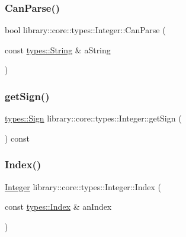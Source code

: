 \subsubsection{\texorpdfstring{CanParse()}{CanParse()}\hspace{0.1cm}{\footnotesize\ttfamily [2/2]}}
{\footnotesize\ttfamily bool library\+::core\+::types\+::\+Integer\+::\+Can\+Parse (\begin{DoxyParamCaption}\item[{const \mbox{\hyperlink{classlibrary_1_1core_1_1types_1_1_string}{types\+::\+String}} \&}]{a\+String }\end{DoxyParamCaption})\hspace{0.3cm}{\ttfamily [static]}}

\mbox{\label{classlibrary_1_1core_1_1types_1_1_integer_abe567cca5d1e448329195df5d16d48e6}} 
\subsubsection{\texorpdfstring{getSign()}{getSign()}}
{\footnotesize\ttfamily \mbox{\hyperlink{namespacelibrary_1_1core_1_1types_a06d9eaa410d43a0fa3f383040618e87d}{types\+::\+Sign}} library\+::core\+::types\+::\+Integer\+::get\+Sign (\begin{DoxyParamCaption}{ }\end{DoxyParamCaption}) const}

\mbox{\label{classlibrary_1_1core_1_1types_1_1_integer_a902099e195d18a7d843c7cdd9a4f349c}} 
\subsubsection{\texorpdfstring{Index()}{Index()}}
{\footnotesize\ttfamily \mbox{\hyperlink{classlibrary_1_1core_1_1types_1_1_integer}{Integer}} library\+::core\+::types\+::\+Integer\+::\+Index (\begin{DoxyParamCaption}\item[{const \mbox{\hyperlink{namespacelibrary_1_1core_1_1types_ad87eeb821d7067ec94e06ed1980d6350}{types\+::\+Index}} \&}]{an\+Index }\end{DoxyParamCaption})\hspace{0.3cm}{\ttfamily [static]}}

